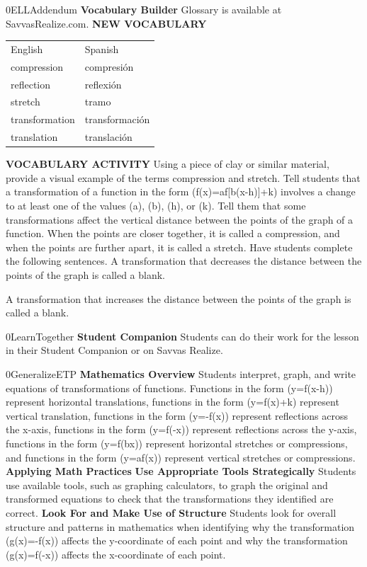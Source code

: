 \documentclass{article}
\newenvironment{te-addendum}[2]{}{}     %
\newcommand{\answer}[1]{}               %
\newcommand{\placeholder}[2]{}          %
\newcommand{\te}[1]{}                   %
\begin{document}
\begin{te-addendum}{0}{ELLAddendum}
\textbf{Vocabulary Builder}
Glossary is available at SavvasRealize.com.
\textbf{NEW VOCABULARY}
\begin{tabular}{ll}
English & Spanish \\
compression & compresión \\
reflection & reflexión \\
stretch & tramo \\
transformation & transformación \\
translation & translación \\
\end{tabular}
\textbf{VOCABULARY ACTIVITY}
Using a piece of clay or similar material, provide a visual example of the terms compression and stretch. Tell students that a transformation of a function in the form (f(x)=a\cdot f[b(x-h)]+k) involves a change to at least one of the values (a), (b), (h), or (k). Tell them that some transformations affect the vertical distance between the points of the graph of a function. When the points are closer together, it is called a compression, and when the points are further apart, it is called a stretch. Have students complete the following sentences.
A transformation that decreases the distance between the points of the graph is called a blank.
\answer{compression}
A transformation that increases the distance between the points of the graph is called a blank.
\answer{stretch}
\end{te-addendum}
\begin{te-addendum}{0}{LearnTogether}
\textbf{Student Companion}
Students can do their work for the lesson in their Student Companion or on Savvas Realize.
\placeholder{illustration}{Student Companion cover, dark background with colored loops, white title Student Companion and enVision Algebra 2.}
\end{te-addendum}
\begin{te-addendum}{0}{GeneralizeETP}
\textbf{Mathematics Overview}
Students interpret, graph, and write equations of transformations of functions. Functions in the form (y=f(x-h)) represent horizontal translations, functions in the form (y=f(x)+k) represent vertical translation, functions in the form (y=-f(x)) represent reflections across the x-axis, functions in the form (y=f(-x)) represent reflections across the y-axis, functions in the form (y=f(bx)) represent horizontal stretches or compressions, and functions in the form (y=af(x)) represent vertical stretches or compressions.
\textbf{Applying Math Practices}
\textbf{Use Appropriate Tools Strategically}
Students use available tools, such as graphing calculators, to graph the original and transformed equations to check that the transformations they identified are correct.
\textbf{Look For and Make Use of Structure}
Students look for overall structure and patterns in mathematics when identifying why the transformation (g(x)=-f(x)) affects the y-coordinate of each point and why the transformation (g(x)=f(-x)) affects the x-coordinate of each point.
\te{SavvasRealize.com: Program Resources.}
\end{te-addendum}
\end{document}
